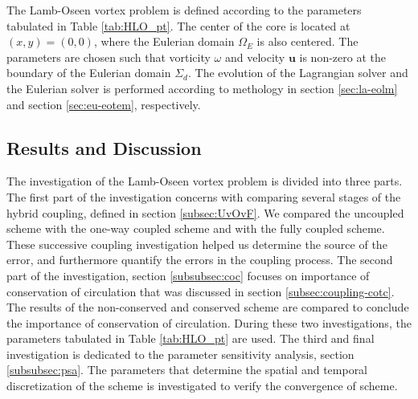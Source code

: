 The Lamb-Oseen vortex problem is defined according to the parameters tabulated in Table \ref{tab:HLO_pt}. The center of the core is located at $(x,y)=(0,0)$, where the Eulerian domain $\Omega_E$ is also centered. The parameters are chosen such that vorticity $\omega$ and velocity $\mathbf{u}$ is non-zero at the boundary of the Eulerian domain $\Sigma_d$. The evolution of the Lagrangian solver and the Eulerian solver is performed according to methology in section \ref{sec:la-eolm} and section \ref{sec:eu-eotem}, respectively.


\subsection{Results and Discussion}

The investigation of the Lamb-Oseen vortex problem is divided into three parts. The first part of the investigation concerns with comparing several stages of the hybrid coupling, defined in section \ref{subsec:UvOvF}. We compared the uncoupled scheme with the one-way coupled scheme and with the fully coupled scheme. These successive coupling investigation helped us determine the source of the error, and furthermore quantify the errors in the coupling process. The second part of the investigation, section \ref{subsubsec:coc} focuses on importance of conservation of circulation that was discussed in section \ref{subsec:coupling-cotc}. The results of the non-conserved and conserved scheme are compared to conclude the importance of conservation of circulation. During these two investigations, the parameters tabulated in Table \ref{tab:HLO_pt} are used. The third and final investigation is dedicated to the parameter sensitivity analysis, section \ref{subsubsec:psa}. The parameters that determine the spatial and temporal discretization of the scheme is investigated to verify the convergence of scheme.

